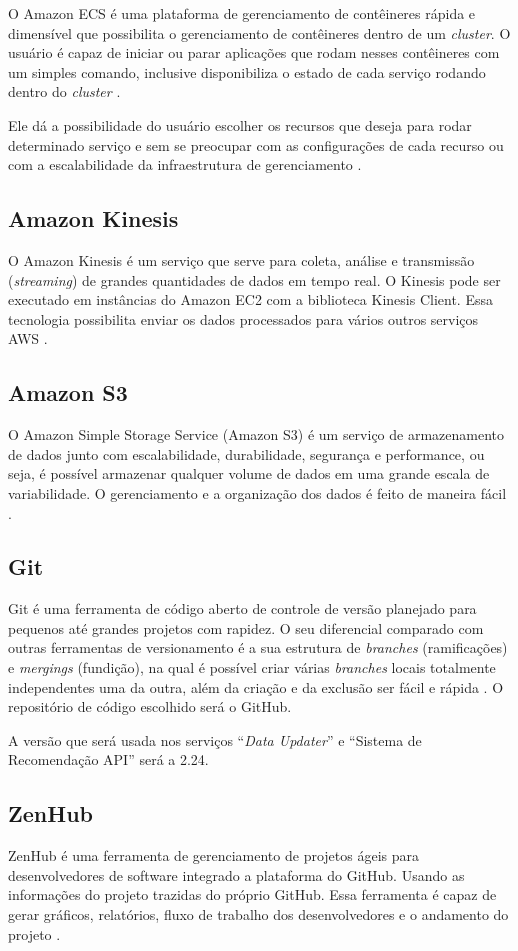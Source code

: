 O Amazon ECS é uma plataforma de gerenciamento de contêineres rápida e dimensível que possibilita o gerenciamento de contêineres dentro de um \textit{cluster}. O usuário é capaz de iniciar ou parar aplicações que rodam nesses contêineres com um simples comando, inclusive disponibiliza o estado de cada serviço rodando dentro do \textit{cluster} \cite{amazonECS:2019}.

Ele dá a possibilidade do usuário escolher os recursos que deseja para rodar determinado serviço e sem se preocupar com as configurações de cada recurso ou com a escalabilidade da infraestrutura de gerenciamento \cite{amazonECS:2019}.

\subsection{Amazon Kinesis}

O Amazon Kinesis é um serviço que serve para coleta, análise e transmissão (\textit{streaming}) de grandes quantidades de dados em tempo real. O Kinesis pode ser executado em instâncias do Amazon EC2 com a biblioteca Kinesis Client. Essa tecnologia possibilita enviar os dados processados para vários outros serviços AWS \cite{KINESIS:2019}.

\subsection{Amazon S3}

O  Amazon Simple Storage Service (Amazon S3) é um serviço de armazenamento de dados junto com escalabilidade, durabilidade, segurança e performance, ou seja, é possível armazenar qualquer volume de dados em uma grande escala de variabilidade. O gerenciamento e a organização dos dados é feito de maneira fácil \cite{S3:2019}.

\subsection{Git}

Git é uma ferramenta de código aberto de controle de versão planejado para pequenos até grandes projetos com rapidez. O seu diferencial comparado com outras ferramentas de versionamento é a sua estrutura de \textit{branches} (ramificações) e \textit{mergings} (fundição), na qual é possível criar várias \textit{branches} locais totalmente independentes uma da outra, além da criação e da exclusão ser fácil e rápida \cite{git:2019}. O repositório de código escolhido será o GitHub.

A versão que será usada nos serviços “\textit{Data Updater}” e “Sistema de Recomendação API” será a 2.24.

\subsection{ZenHub}
\label{section_zenhub}

ZenHub é uma ferramenta de gerenciamento de projetos ágeis para desenvolvedores de software integrado a plataforma do GitHub. Usando as informações do projeto trazidas do próprio GitHub. Essa ferramenta é capaz de gerar gráficos, relatórios, fluxo de trabalho dos desenvolvedores e o andamento do projeto \cite{zenhub:2019}.
